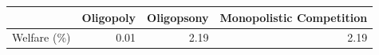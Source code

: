 \begin{tabular}{lrrr}
 & Oligopoly & Oligopsony & Monopolistic Competition \\  \hline
Welfare (\%)
& 0.01 & 2.19 & 2.19   \\ \end{tabular}   

